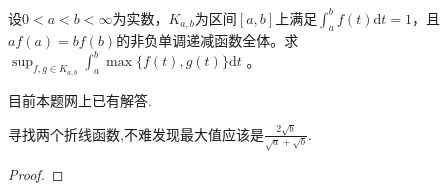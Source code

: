 \documentclass[../../main.tex]{subfiles}
\begin{document}
\begin{example}
设\(0 < a < b < \infty\)为实数，\(K_{a,b}\)为区间\([a,b]\)上满足\(\int_{a}^{b}f(t)\mathrm{d}t = 1\)，且\(af(a)=bf(b)\)的非负单调递减函数全体。求\(\sup_{f,g\in K_{a,b}}\int_{a}^{b}\max\{f(t),g(t)\}\mathrm{d}t\) 。
\end{example}
\begin{remark}
目前本题网上已有解答.
\end{remark}
\begin{note}
寻找两个折线函数,不难发现最大值应该是$\frac{2\sqrt{b}}{\sqrt{a}+\sqrt{b}}$.
\end{note}

\begin{example}

\end{example}
\begin{proof}

\end{proof}
\end{document}
